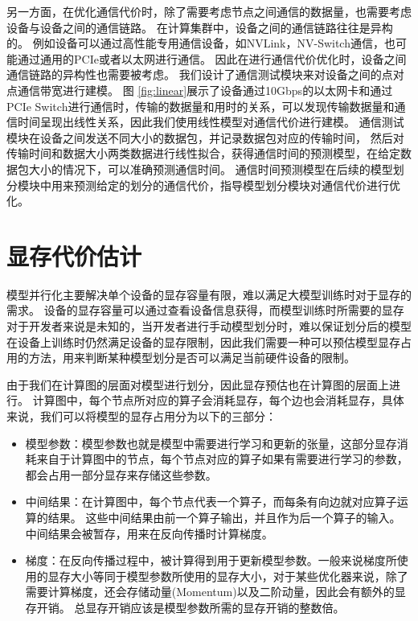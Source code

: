 另一方面，在优化通信代价时，除了需要考虑节点之间通信的数据量，也需要考虑设备与设备之间的通信链路。
在计算集群中，设备之间的通信链路往往是异构的。
例如设备可以通过高性能专用通信设备，如NVLink，NV-Switch通信，也可能通过通用的PCIe或者以太网进行通信。
因此在进行通信代价优化时，设备之间通信链路的异构性也需要被考虑。
我们设计了通信测试模块来对设备之间的点对点通信带宽进行建模。
图 \ref{fig:linear}展示了设备通过10Gbps的以太网卡和通过PCIe Switch进行通信时，传输的数据量和用时的关系，可以发现传输数据量和通信时间呈现出线性关系，因此我们使用线性模型对通信代价进行建模。
通信测试模块在设备之间发送不同大小的数据包，并记录数据包对应的传输时间，
然后对传输时间和数据大小两类数据进行线性拟合，获得通信时间的预测模型，在给定数据包大小的情况下，可以准确预测通信时间。
通信时间预测模型在后续的模型划分模块中用来预测给定的划分的通信代价，指导模型划分模块对通信代价进行优化。

\section{显存代价估计}
\label{sec:mem}
模型并行化主要解决单个设备的显存容量有限，难以满足大模型训练时对于显存的需求。
设备的显存容量可以通过查看设备信息获得，而模型训练时所需要的显存对于开发者来说是未知的，当开发者进行手动模型划分时，难以保证划分后的模型在设备上训练时仍然满足设备的显存限制，因此我们需要一种可以预估模型显存占用的方法，用来判断某种模型划分是否可以满足当前硬件设备的限制。



由于我们在计算图的层面对模型进行划分，因此显存预估也在计算图的层面上进行。
计算图中，每个节点所对应的算子会消耗显存，每个边也会消耗显存，具体来说，我们可以将模型的显存占用分为以下的三部分：
\begin{itemize}
	\item 模型参数：模型参数也就是模型中需要进行学习和更新的张量，这部分显存消耗来自于计算图中的节点，每个节点对应的算子如果有需要进行学习的参数，都会占用一部分显存来存储这些参数。
	\item 中间结果：在计算图中，每个节点代表一个算子，而每条有向边就对应算子运算的结果。
	这些中间结果由前一个算子输出，并且作为后一个算子的输入。中间结果会被暂存，用来在反向传播时计算梯度。
	\item 梯度：在反向传播过程中，被计算得到用于更新模型参数。一般来说梯度所使用的显存大小等同于模型参数所使用的显存大小，对于某些优化器来说，除了需要计算梯度，还会存储动量(Momentum)以及二阶动量，因此会有额外的显存开销。
	总显存开销应该是模型参数所需的显存开销的整数倍。
\end{itemize}

